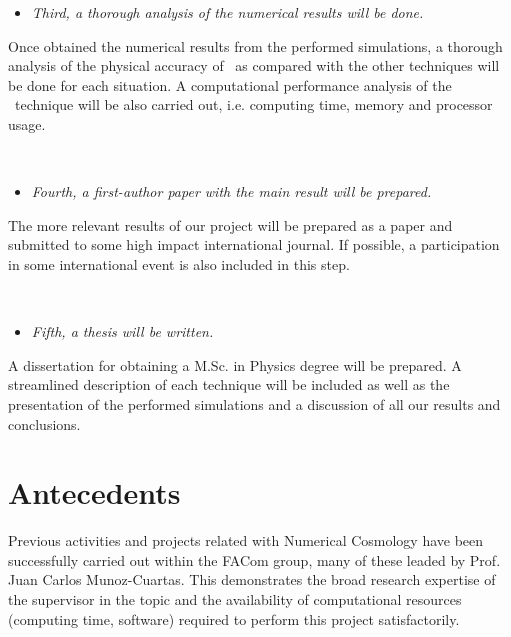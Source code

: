 \documentclass[a4,useAMS,usenatbib,usegraphicx,12pt]{article}
\begin{document}
\begin{itemize}
\item[\checkmark] \textit{Third, a thorough analysis of the numerical results 
will be done.}
\end{itemize}


Once obtained the numerical results from the performed simulations, a thorough
analysis of the physical accuracy of \VPH\ as compared with the other techniques
will be done for each situation. A computational performance analysis of the 
\VPH\ technique will be also carried out, i.e. computing time, memory and 
processor usage.

\

\begin{itemize}
\item[\checkmark] \textit{Fourth, a first-author paper with the main result will
be prepared.}
\end{itemize}


The more relevant results of our project will be prepared as a paper and 
submitted to some high impact international journal. If possible, a participation
in some international event is also included in this step.

\

\begin{itemize}
\item[\checkmark] \textit{Fifth, a thesis will be written.}
\end{itemize}


A dissertation for obtaining a M.Sc. in Physics degree will be prepared. A
streamlined description of each technique will be included as well as the 
presentation of the performed simulations and a discussion of all our results
and conclusions.


\section{Antecedents}
Previous activities and projects related with Numerical Cosmology have been 
successfully carried out within the FACom group, many of these leaded by Prof. 
Juan Carlos Munoz-Cuartas. This demonstrates the broad research expertise of the 
supervisor in the topic and the availability of computational resources (computing
time, software) required to perform this project satisfactorily.

\
\end{document}
